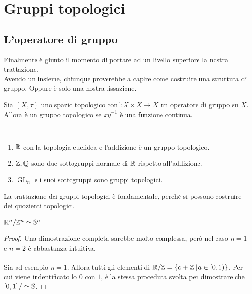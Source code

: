 \section{Gruppi topologici}
\subsection{\textcolor{TopGener}{\textbf{L'operatore di gruppo}}}
Finalmente è giunto il momento di portare ad un livello superiore la nostra trattazione. \\ Avendo un insieme, chiunque proverebbe a capire come costruire una struttura di gruppo. Oppure è solo una nostra fissazione.



\begin{definition}
	Sia $(X, \tau)$ uno spazio topologico con $\dot \colon X \times X \rightarrow X$ un operatore di gruppo su $X$. \\ Allora è un gruppo topologico se $x \dot y^{-1}$ è una funzione continua.
\end{definition}

\begin{example} \
\begin{enumerate}
	\item $\R$ con la topologia euclidea e l'addizione è un gruppo topologico.
	\item $\Z, \Q$ sono due sottogruppi normale di $\R$ rispetto all'addizione. 
	\item $\operatorname{GL}_n$ e i suoi sottogruppi sono gruppi topologici.
\end{enumerate}
\end{example}

La trattazione dei gruppi topologici è fondamentale, perché si possono costruire dei quozienti topologici.
\begin{theorem}
	$\R^n / \Z^n \simeq \S^n$
\end{theorem}
\begin{proof}
	Una dimostrazione completa sarebbe molto complessa, però nel caso $n=1$ e $n=2$ è abbastanza intuitiva. \\ \\
	
	Sia ad esempio $n=1$. Allora tutti gli elementi di $\R / \Z = \left\{a + \Z \,\middle|\, a \in \left[0,1\right) \right\}$. 
	Per cui viene indentificato lo $0$ con $1$, è la stessa procedura svolta per dimostrare che $\left[0,1\right]/ \simeq \S$. 
\end{proof}
